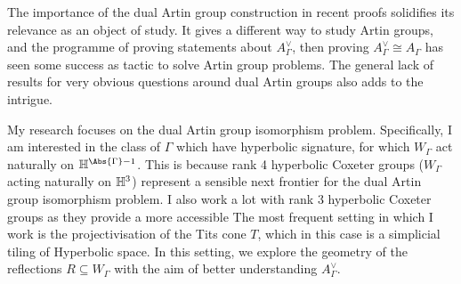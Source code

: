 The importance of the dual Artin group construction in recent proofs solidifies its relevance as an object of study.
It gives a different way to study Artin groups, and the programme of proving statements about $A^\vee_\Gamma$, then proving  $A^\vee_\Gamma \cong A_\Gamma$ has seen some success as tactic to solve Artin group problems.
The general lack of results for very obvious questions around dual Artin groups also adds to the intrigue.

My research focuses on the dual Artin group isomorphism problem.
Specifically, I am interested in the class of $\Gamma$ which have hyperbolic signature, for which  $W_\Gamma$ act naturally on  $\Hbb^{\Abs{\Gamma}-1}$.
This is because rank 4  hyperbolic Coxeter groups ($W_\Gamma$ acting naturally on $\mathbb{H}^3$) represent a sensible next frontier for the dual Artin group isomorphism problem.
I also work a lot with rank 3 hyperbolic Coxeter groups as they provide a more accessible
The most frequent setting in which I work is the projectivisation of the Tits cone $T$, which in this case is a simplicial tiling of Hyperbolic space.
In this setting, we explore the geometry of the reflections $R \subseteq W_\Gamma$ with the aim of better understanding  $A^\vee_\Gamma$.




